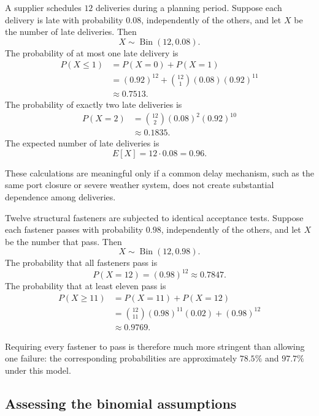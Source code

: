 \begin{example}\par
A supplier schedules $12$ deliveries during a planning period. Suppose each delivery is late with probability $0.08$, independently of the others, and let $X$ be the number of late deliveries. Then
\[
X\sim\operatorname{Bin}(12,0.08).
\]
The probability of at most one late delivery is
\[
\begin{aligned}
P(X\leq1)
&=P(X=0)+P(X=1)\\
&=(0.92)^{12}
+\binom{12}{1}(0.08)(0.92)^{11}\\
&\approx0.7513.
\end{aligned}
\]
The probability of exactly two late deliveries is
\[
\begin{aligned}
P(X=2)
&=\binom{12}{2}(0.08)^2(0.92)^{10}\\
&\approx0.1835.
\end{aligned}
\]
The expected number of late deliveries is
\[
E[X]=12\cdot0.08=0.96.
\]
\par\noindent These calculations are meaningful only if a common delay mechanism, such as the same port closure or severe weather system, does not create substantial dependence among deliveries.
\end{example}

\begin{example}\par
Twelve structural fasteners are subjected to identical acceptance tests. Suppose each fastener passes with probability $0.98$, independently of the others, and let $X$ be the number that pass. Then
\[
X\sim\operatorname{Bin}(12,0.98).
\]
The probability that all fasteners pass is
\[
P(X=12)=(0.98)^{12}\approx0.7847.
\]
The probability that at least eleven pass is
\[
\begin{aligned}
P(X\geq11)
&=P(X=11)+P(X=12)\\
&=\binom{12}{11}(0.98)^{11}(0.02)+(0.98)^{12}\\
&\approx0.9769.
\end{aligned}
\]
\par\noindent Requiring every fastener to pass is therefore much more stringent than allowing one failure: the corresponding probabilities are approximately $78.5\%$ and $97.7\%$ under this model.
\end{example}

\subsection{Assessing the binomial assumptions}

